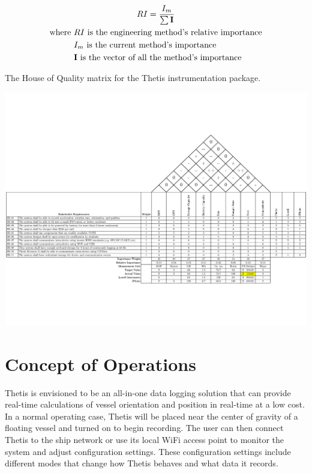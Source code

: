 \begin{gather}
	\label{eq:hoq_rel_importance}
	RI = \frac{I_m}{\sum{\textbf{I}}} \\
	\begin{aligned}
		\text{where } &RI \text{ is the engineering method's relative importance} \\
					  &I_m \text{ is the current method's importance} \\
					  &\textbf{I} \text{ is the vector of all the method's importance} \\
	\end{aligned} \notag
\end{gather}

\begin{landscape}
	\begin{table}
		\caption[House of Quality]{The House of Quality matrix for the Thetis instrumentation package.}
		\label{tab:hoq}
		\centering
		\includegraphics[height=\textwidth-24pt]{../include/ThetisHOQ.pdf}
	\end{table}
\end{landscape}

\section{Concept of Operations} \label{sec:conops}
Thetis is envisioned to be an all-in-one data logging solution that can provide real-time calculations of vessel orientation and position in real-time at a low cost.
In a normal operating case, Thetis will be placed near the center of gravity of a floating vessel and turned on to begin recording.
The user can then connect Thetis to the ship network or use its local WiFi access point to monitor the system and adjust configuration settings.
These configuration settings include different modes that change how Thetis behaves and what data it records.

